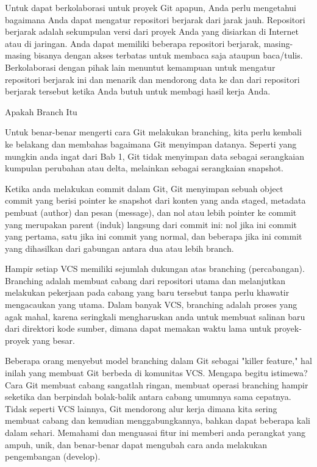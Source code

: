 \noindent 
{\fontsize{14pt}{14pt}\selectfont Untuk dapat berkolaborasi untuk proyek Git apapun, Anda perlu mengetahui bagaimana Anda dapat mengatur repositori berjarak dari jarak jauh. Repositori berjarak adalah sekumpulan versi dari proyek Anda yang disiarkan di Internet atau di jaringan. Anda dapat memiliki beberapa repositori berjarak, masing-masing bisanya dengan akses terbatas untuk membaca saja ataupun baca/tulis. Berkolaborasi dengan pihak lain menuntut kemampuan untuk mengatur repositori berjarak ini dan menarik dan mendorong data ke dan dari repositori berjarak tersebut ketika Anda butuh untuk membagi hasil kerja Anda. \\} \par
\vspace{14pt}
\noindent 
{\fontsize{14pt}{14pt}\selectfont Apakah Branch Itu \\} \par
\noindent 
{\fontsize{14pt}{14pt}\selectfont Untuk benar-benar mengerti cara Git melakukan branching, kita perlu kembali ke belakang dan membahas bagaimana Git menyimpan datanya. Seperti yang mungkin anda ingat dari Bab 1, Git tidak menyimpan data sebagai serangkaian kumpulan perubahan atau delta, melainkan sebagai serangkaian snapshot. \\} \par
\noindent 
{\fontsize{14pt}{14pt}\selectfont Ketika anda melakukan commit dalam Git, Git menyimpan sebuah object commit yang berisi pointer ke snapshot dari konten yang anda staged, metadata pembuat (author) dan pesan (message), dan nol atau lebih pointer ke commit yang merupakan parent (induk) langsung dari commit ini: nol jika ini commit yang pertama, satu jika ini commit yang normal, dan beberapa jika ini commit yang dihasilkan dari gabungan antara dua atau lebih branch. \\} \par
\vspace{14pt}
\noindent 
{\fontsize{14pt}{14pt}\selectfont Hampir setiap VCS memiliki sejumlah dukungan atas branching (percabangan). Branching adalah membuat cabang dari repositori utama dan melanjutkan melakukan pekerjaan pada cabang yang baru tersebut tanpa perlu khawatir mengacaukan yang utama. Dalam banyak VCS, branching adalah proses yang agak mahal, karena seringkali mengharuskan anda untuk membuat salinan baru dari direktori kode sumber, dimana dapat memakan waktu lama untuk proyek-proyek yang besar. \\} \par
\noindent 
{\fontsize{14pt}{14pt}\selectfont Beberapa orang menyebut model branching dalam Git sebagai "killer feature," hal inilah yang membuat Git berbeda di komunitas VCS. Mengapa begitu istimewa? Cara Git membuat cabang sangatlah ringan, membuat operasi branching hampir seketika dan berpindah bolak-balik antara cabang umumnya sama cepatnya. Tidak seperti VCS lainnya, Git mendorong alur kerja dimana kita sering membuat cabang dan kemudian menggabungkannya, bahkan dapat beberapa kali dalam sehari. Memahami dan menguasai fitur ini memberi anda perangkat yang ampuh, unik, dan benar-benar dapat mengubah cara anda melakukan pengembangan (develop). \\} \par
\vspace{14pt}
